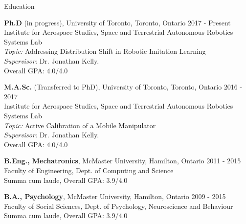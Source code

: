 \documentclass[usenames, dvipsnames]{resume} %
\begin{document}
	




% 
%


\begin{rSection}{Education}

\textbf{Ph.D} (in progress), University of Toronto, Toronto, Ontario \hfill {2017 - Present} \\
Institute for Aerospace Studies, Space and Terrestrial Autonomous Robotics Systems Lab \smallskip \\
\textit{Topic:} Addressing Distribution Shift in Robotic Imitation Learning\\
\textit{Supervisor:} Dr. Jonathan Kelly. \smallskip \\
Overall GPA: 4.0/4.0

\textbf{M.A.Sc.} (Transferred to PhD), University of Toronto, Toronto, Ontario \hfill {2016 - 2017} \\
Institute for Aerospace Studies, Space and Terrestrial Autonomous Robotics Systems Lab \smallskip \\
\textit{Topic:} Active Calibration of a Mobile Manipulator \\
\textit{Supervisor:} Dr. Jonathan Kelly. \smallskip \\
Overall GPA: 4.0/4.0

\textbf{B.Eng., Mechatronics}, McMaster University, Hamilton, Ontario \hfill {2011 - 2015} \\
Faculty of Engineering, Dept. of Computing and Science \smallskip \\
Summa cum laude, Overall GPA: 3.9/4.0

\textbf{B.A., Psychology}, McMaster University, Hamilton, Ontario \hfill {2009 - 2015} \\
Faculty of Social Sciences, Dept. of Psychology, Neuroscience and Behaviour \smallskip \\
Summa cum laude, Overall GPA: 3.9/4.0

\end{rSection}
\end{document}
